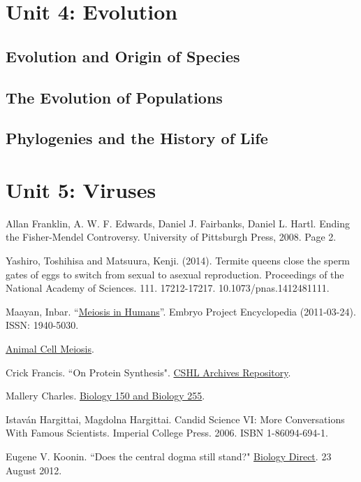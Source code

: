 \documentclass[12pt]{article}
\begin{document}
\section{Unit 4: Evolution}
\subsection{Evolution and Origin of Species}
\subsection{The Evolution of Populations}
\subsection{Phylogenies and the History of Life}

\section{Unit 5: Viruses}

\begin{thebibliography}{00}
     Allan Franklin, A. W. F. Edwards, Daniel J. Fairbanks, Daniel L. Hartl. Ending the Fisher-Mendel Controversy. University of Pittsburgh Press, 2008. Page 2.

     Yashiro, Toshihisa and Matsuura, Kenji. (2014). Termite queens close the sperm gates of eggs to switch from sexual to asexual reproduction. Proceedings of the National Academy of Sciences. 111. 17212-17217. 10.1073/pnas.1412481111. 

     Maayan, Inbar. ``\href{http://embryo.asu.edu/handle/10776/2084}{Meiosis in Humans}''. Embryo Project Encyclopedia (2011-03-24). ISSN: 1940-5030. 

     \href{https://www.cellsalive.com/meiosis_js.htm}{Animal Cell Meiosis}.

     Crick Francis. ``On Protein Synthesis". \href{https://libgallery.cshl.edu}{CSHL Archives Repository}.

     Mallery Charles. \href{http://henge.bio.miami.edu/mallery/150/}{Biology 150 and Biology 255}.
        
     Istav{\'a}n Hargittai, Magdolna Hargittai. Candid Science VI: More Conversations With Famous Scientists. Imperial College Press. 2006. ISBN 1-86094-694-1.

     Eugene V. Koonin. ``Does the central dogma still stand?" \href{https://biologydirect.biomedcentral.com/articles/10.1186/1745-6150-7-27}{Biology Direct}. 23 August 2012. 
\end{thebibliography}
\end{document}
